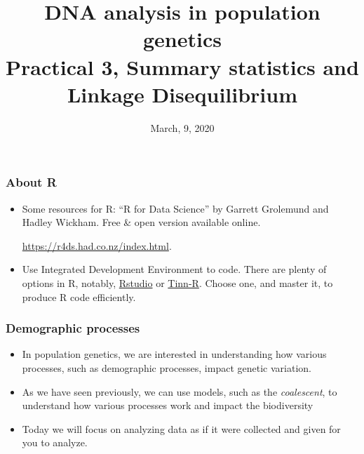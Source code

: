 \documentclass[8pt]{beamer}
\title{DNA analysis in population genetics\\
Practical 3, Summary statistics and Linkage Disequilibrium}
\date{March, 9, 2020}
\author{
    \texorpdfstring{
        \begin{columns}
              \column{.45\linewidth}
              \centering
              Chedly Kastally\\
              \href{mailto:chedly.kastally@oulu.fi}{chedly.kastally@oulu.fi}
              \column{.45\linewidth}
              \centering
              Tanja Pyh{\"a}j{\"a}rvi\\
              \href{mailto:tanja.pyhajarvi@oulu.fi}{tanja.pyhajarvi@oulu.fi}
        \end{columns}
    }
    {Kastally, Chedly \and Tanja Pyh{\"a}j{\"a}rvi}
}
\begin{document}
\begin{frame}
\titlepage
\end{frame}


\begin{frame}
    \frametitle{About R}

    \begin{minipage}{.6\textwidth}
    \begin{itemize}
    
        \item<1-> Some resources for R: ``R for Data Science'' by Garrett
            Grolemund and Hadley Wickham. Free \& open version available online.

            \url{https://r4ds.had.co.nz/index.html}.

        \item<2-> Use Integrated Development Environment to code. There
            are plenty of options in R, notably,
            \href{https://rstudio.com/}{Rstudio} or
            \href{https://nbcgib.uesc.br/tinnr/en/}{Tinn-R}.
            Choose one, and master it, to produce R code
            efficiently.

    \end{itemize}
\end{minipage}%
    \begin{minipage}{.3\textwidth}
        \flushright
\end{minipage}

\end{frame}

\begin{frame}
    \frametitle{Demographic processes}

    \large

    \begin{itemize}
    
        \item<1-> In population genetics, we are interested in understanding how
            various processes, such as demographic processes, impact genetic
            variation.

        \item<2-> As we have seen previously, we can use models, such as
            the \textit{coalescent}, to understand how various processes
            work and impact the biodiversity

        \item<3-> Today we will focus on analyzing data as if it were
            collected and given for you to analyze.

    \end{itemize}

\end{frame}
\end{document}
